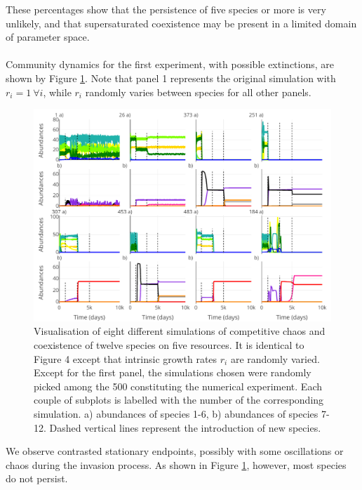 These percentages show that the persistence of five species or more is very unlikely, and that supersaturated coexistence may be present in a limited domain of parameter space.\\
\\
Community dynamics for the first experiment, with possible extinctions, are shown by Figure \ref{figures:Figexp1}. Note that panel 1 represents the original simulation with $r_i=1 ~\forall i$, while $r_i$ randomly varies between species for all other panels. 

\begin{figure}[H]
\begin{center} 
 \includegraphics[width=1\textwidth]{../Code/Figures/Figure_exp1.pdf}
  \caption{Visualisation of eight different simulations of competitive chaos and coexistence of twelve species on five resources. It is identical to Figure 4 except that intrinsic growth rates $r_i$ are randomly varied. Except for the first panel, the simulations chosen were randomly picked among the 500 constituting the numerical experiment. Each couple of subplots is labelled with the number of the corresponding simulation. a) abundances of species 1-6, b) abundances of species 7-12. Dashed vertical lines represent the introduction of new species.}
  \label{figures:Figexp1}
\end{center}
\end{figure}

We observe contrasted stationary endpoints, possibly with some oscillations or chaos during the invasion process. As shown in Figure \ref{figures:Figexp1}, however, most species do not persist. 

